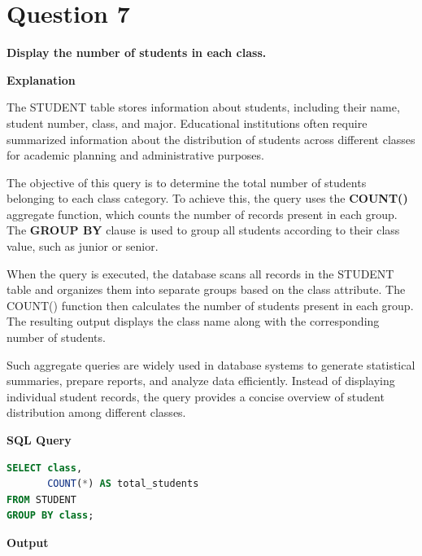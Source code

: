 \documentclass[12pt,a4paper]{report}
\begin{document}
\vspace{-1cm}

\section*{Question 7}

\textbf{Display the number of students in each class.}

\vspace{0.4cm}

\textbf{Explanation}

The STUDENT table stores information about students, including their name, student number, class, and major. Educational institutions often require summarized information about the distribution of students across different classes for academic planning and administrative purposes.

The objective of this query is to determine the total number of students belonging to each class category. To achieve this, the query uses the \textbf{COUNT()} aggregate function, which counts the number of records present in each group. The \textbf{GROUP BY} clause is used to group all students according to their class value, such as junior or senior.

When the query is executed, the database scans all records in the STUDENT table and organizes them into separate groups based on the class attribute. The COUNT() function then calculates the number of students present in each group. The resulting output displays the class name along with the corresponding number of students.

Such aggregate queries are widely used in database systems to generate statistical summaries, prepare reports, and analyze data efficiently. Instead of displaying individual student records, the query provides a concise overview of student distribution among different classes.

\vspace{0.4cm}

\textbf{SQL Query}

\begin{lstlisting}[language=SQL]
SELECT class,
       COUNT(*) AS total_students
FROM STUDENT
GROUP BY class;
\end{lstlisting}

\vspace{0.5cm}

\textbf{Output}

\vspace{0.3cm}
\end{document}
